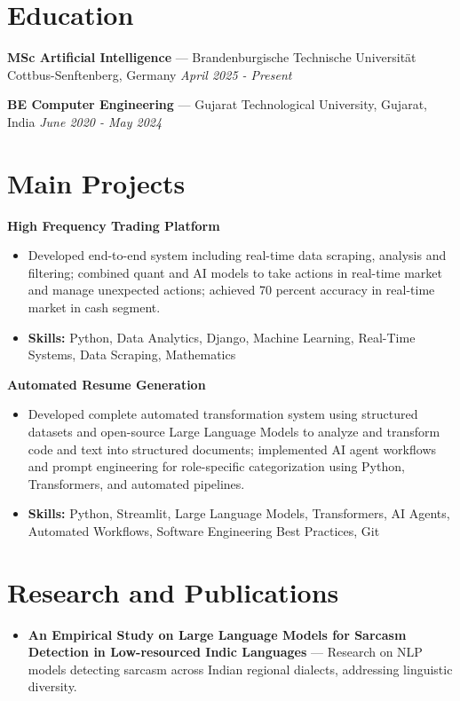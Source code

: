 \documentclass[a4paper,10pt]{article}
\begin{document}
\section*{Education}
\textbf{MSc Artificial Intelligence} — Brandenburgische Technische Universität Cottbus-Senftenberg, Germany \hfill \textit{April 2025 - Present}\par
\vspace{1.5pt}
\textbf{BE Computer Engineering} — Gujarat Technological University, Gujarat, India \hfill \textit{June 2020 - May 2024}\par

\section*{Main Projects}
\textbf{High Frequency Trading Platform}\par
\vspace{1pt}
\begin{itemize}
  \item Developed end-to-end system including real-time data scraping, analysis and filtering; combined quant and AI models to take actions in real-time market and manage unexpected actions; achieved 70 percent accuracy in real-time market in cash segment.
  \item \textbf{Skills:} Python, Data Analytics, Django, Machine Learning, Real-Time Systems, Data Scraping, Mathematics
\end{itemize}
\vspace{3pt}
\textbf{Automated Resume Generation}\par
\vspace{1pt}
\begin{itemize}
  \item Developed complete automated transformation system using structured datasets and open-source Large Language Models to analyze and transform code and text into structured documents; implemented AI agent workflows and prompt engineering for role-specific categorization using Python, Transformers, and automated pipelines.
  \item \textbf{Skills:} Python, Streamlit, Large Language Models, Transformers, AI Agents, Automated Workflows, Software Engineering Best Practices, Git
\end{itemize}

\section*{Research and Publications}
\begin{itemize}
\item \textbf{An Empirical Study on Large Language Models for Sarcasm Detection in Low-resourced Indic Languages} — Research on NLP models detecting sarcasm across Indian regional dialects, addressing linguistic diversity.
\end{itemize}
\end{document}

